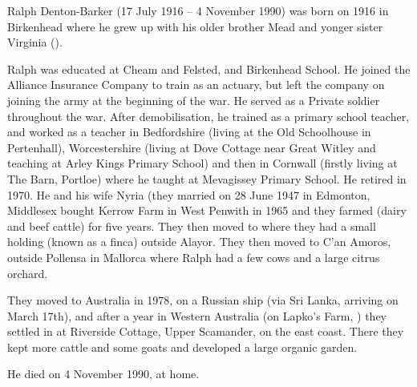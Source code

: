 
Ralph Denton-Barker (17 July 1916 -- 4 November 1990) was born on 1916 in Birkenhead \cite{BMDIndex_RalphMundayDentonBarker_birth} where he grew up with his older brother Mead and yonger sister Virginia ().

Ralph was educated at Cheam and Felsted, and Birkenhead School. He joined the Alliance Insurance Company to train as an actuary, but left the company on joining the army at the beginning of the war. He served as a Private soldier throughout the war. After demobilisation, he trained as a primary school teacher, and worked as a teacher in Bedfordshire (living at the Old Schoolhouse in Pertenhall), Worcestershire (living at Dove Cottage near Great Witley and teaching at Arley Kings Primary School) and then in Cornwall (firstly living at The Barn, Portloe) where he taught at Mevagissey Primary School.  He retired in 1970.  He and his wife Nyria (they married on 28 June 1947 in Edmonton, Middlesex \cite{MarriageCertRalphDentonBarkerJoanNyriaPowell} bought Kerrow Farm in West Penwith in 1965 and they farmed (dairy and beef cattle) for five years. They then moved to  where they had a small holding (known as a finca) outside Alayor. They then moved to C'an Amoros, outside Pollensa in Mallorca where Ralph had a few cows and a large citrus orchard.

They moved to Australia in 1978, on a Russian ship (via Sri Lanka, arriving on March 17th), and after a year in Western Australia (on Lapko's Farm, ) they settled in  at Riverside Cottage, Upper Scamander, on the east coast. There they kept more cattle and some goats and developed a large organic garden.

He died on 4 November 1990, at home.

